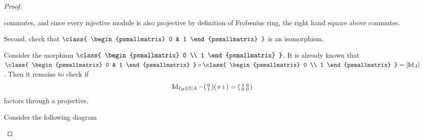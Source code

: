\begin{proof}
\begin{enumerate}[label={(\bfseries TR\arabic*)}]
{\begin{center}
            \end{center}
            commutes, and since every injective module is also projective by definition of Frobenius ring, the right hand square above commutes.

            Second, check that \( \class{
                \begin{psmallmatrix}
                    0 & 1
                \end{psmallmatrix}
            } \) is an isomorphism.

            Consider the morphism \( \class{
                \begin{psmallmatrix}
                    0 \\
                    1
                \end{psmallmatrix}
            } \).
            It is already known that \( \class{
                \begin{psmallmatrix}
                    0 & 1
                \end{psmallmatrix}
            } \circ \class{
                \begin{psmallmatrix}
                    0 \\
                    1
                \end{psmallmatrix}
            } = [\Id_A] \).
            Then it remains to check if
            \[
                \operatorname{Id}_{I_B \oplus \Sigma A} -
                \begin{psmallmatrix}
                    0 \\
                    1
                \end{psmallmatrix}
                \begin{psmallmatrix}
                    0 & 1
                \end{psmallmatrix}
                =
                \begin{psmallmatrix}
                    1 & 0 \\
                    0 & 0
                \end{psmallmatrix}
            \]
            factors through a projective.

            Consider the following diagram
            \begin{center}
\end{center}}
\end{enumerate}
\end{proof}
